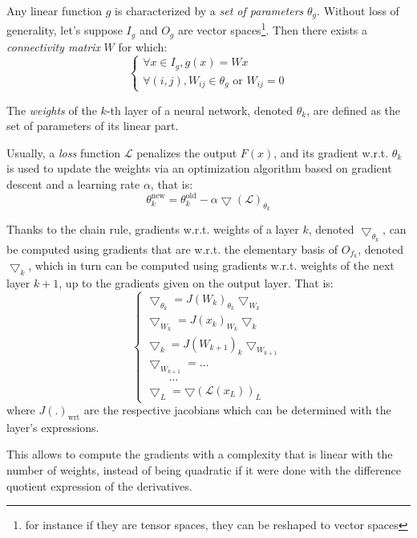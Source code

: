 \documentclass{article}
\theoremstyle{definition}
\begin{document}
Any linear function $g$ is characterized by a \emph{set of parameters} $\theta_g$. Without loss of generality, let's suppose $I_g$ and $O_g$ are vector spaces\footnote{for instance if they are tensor spaces, they can be reshaped to vector spaces}. Then there exists a \emph{connectivity matrix} $W$ for which:
$$
\left\{
\begin{array}{l}
  \forall x \in I_g, g(x) = Wx\\
  \forall (i,j), W_{ij} \in \theta_g \text{ or } W_{ij} = 0
\end{array}
\right.
$$

The \emph{weights} of the $k$-th layer of a neural network, denoted $\theta_k$, are defined as the set of parameters of its linear part.

Usually, a \emph{loss} function $\mathcal{L}$ penalizes the output $F(x)$, and its gradient w.r.t. $\theta_k$ is used to update the weights via an optimization algorithm based on gradient descent and a learning rate $\alpha$, that is:
$$
\theta_k^{\text{new}} = \theta_k^{\text{old}} - \alpha \bigtriangledown(\mathcal{L})_{\theta_k}
$$ 

Thanks to the chain rule, gradients w.r.t. weights of a layer $k$, denoted $\bigtriangledown_{\theta_k}$, can be computed using gradients that are w.r.t. the elementary basis of $O_{f_k}$, denoted $\bigtriangledown_k$, which in turn can be computed using gradients w.r.t. weights of the next layer $k+1$, up to the gradients given on the output layer. That is:
$$
\left\{
\begin{array}{l}
  \bigtriangledown_{\theta_k} = J(W_k)_{\theta_k} \bigtriangledown_{W_k}\\
  \bigtriangledown_{W_k} = J(x_k)_{W_k} \bigtriangledown_{k}\\
  \bigtriangledown_{k} = J(W_{k+1})_{k} \bigtriangledown_{W_{k+1}}\\
  \bigtriangledown_{W_{k+1}} = \ldots\\
  \quad \quad \ldots\\
  \bigtriangledown_{L} = \bigtriangledown(\mathcal{L}(x_L))_L

\end{array}
\right.
$$
where $J(.)_{\text{wrt}}$ are the respective jacobians which can be determined with the layer's expressions.

This allows to compute the gradients with a complexity that is linear with the number of weights, instead of being quadratic if it were done with the difference quotient expression of the derivatives.
\end{document}
